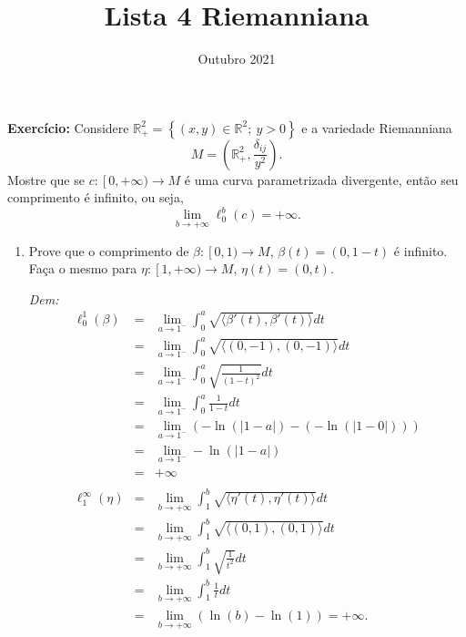 \documentclass[twoside,openright,titlepage,numbers=noenddot,headinclude,  lineheaders footinclude=true,cleardoublepage=empty,BCOR=5mm,paper=a4,fontsize=12pt ]{scrbook}
\title{Lista 4 Riemanniana}
\author{}
\date{Outubro 2021}
\begin{document}
\maketitle

\noindent\textbf{Exercício:} Considere $\mathbb{R}_+^2 = \left\lbrace (x, y) \in \mathbb{R}^2 ; \ y > 0 \right\rbrace$ e a variedade Riemanniana $$ M = \left( \mathbb{R}_+^2, \frac{\delta _{ij}}{y^2} \right) .$$
Mostre que se $c : \left[ 0, + \infty \right. ) \rightarrow M$ é uma curva parametrizada divergente, então seu comprimento é infinito, ou seja, $$ \displaystyle \lim _{b \rightarrow + \infty} \ell _0^b (c) = + \infty .$$

\begin{enumerate}
    \item Prove que o comprimento de $\beta : \left[ 0, 1 \right. ) \rightarrow M$, $\beta (t) = (0, 1 - t)$ é infinito. Faça o mesmo para $\eta : \left[ 1, + \infty \right. ) \rightarrow M$, $\eta (t) = (0, t)$.

\noindent\textit{Dem:}  
    $$ \begin{array}{ccl}
\ell _0^1  (\beta)& = & \displaystyle \lim _{a \rightarrow 1^-} \int _0^a \sqrt{\langle \beta '(t), \beta '(t) \rangle} dt \\
& = & \displaystyle \lim _{a \rightarrow 1^-} \int _0^a \sqrt{\langle (0, -1), (0, -1) \rangle} dt \\ 
& = & \displaystyle \lim _{a \rightarrow 1^-} \int _0^a \sqrt{\frac{1}{(1 - t)^2}} dt \\ 
& = & \displaystyle \lim _{a \rightarrow 1^-} \int _0^a \frac{1}{1 - t}dt \\ 
& = & \displaystyle \lim _{a \rightarrow 1^-} (- \ln(\vert 1 - a \vert) - (- \ln (\vert 1 - 0 \vert )) ) \\
& = & \displaystyle \lim _{a \rightarrow 1^-} - \ln (\vert 1 - a \vert) \\
& = & + \infty 

\\

\\ 

\ell _1^{\infty} (\eta) & = & \displaystyle \lim _{b \rightarrow + \infty} \int _1^b \sqrt{\langle \eta '(t), \eta '(t) \rangle} dt \\ 
& = & \displaystyle \lim _{b \rightarrow + \infty} \int _1^b \sqrt{\langle (0, 1), (0, 1) \rangle} dt \\
& = & \displaystyle \lim _{b \rightarrow + \infty} \int _1^b \sqrt{\frac{1}{t^2}}dt \\ 
& = & \displaystyle \lim _{b \rightarrow + \infty} \int _1^b \frac{1}{t} dt \\ 
& = & \displaystyle \lim _{b \rightarrow + \infty} (\ln(b) - \ln(1)) = + \infty .
    \end{array} $$
    

\end{enumerate}
\end{document}
